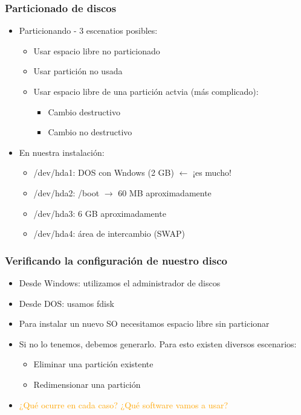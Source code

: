\begin{frame}
	\frametitle{Particionado de discos}
	\begin{itemize}
		\item Particionando - 3 escenatios posibles:
		\begin{itemize}
			\item Usar espacio libre no particionado
			\item Usar partición no usada
			\item Usar espacio libre de una partición actvia (más complicado):
			\begin{itemize}
				\item Cambio destructivo
				\item Cambio no destructivo
			\end{itemize}
		\end{itemize}
		\item En nuestra instalación:
		\begin{itemize}
			\item /dev/hda1: DOS con Wndows (2 GB) $\leftarrow$ ¡es mucho!
			\item /dev/hda2: /boot $\rightarrow$ 60 MB aproximadamente
			\item /dev/hda3: 6 GB aproximadamente
			\item /dev/hda4: área de intercambio (SWAP)
		\end{itemize}
	\end{itemize}
\end{frame}

\begin{frame}
	\frametitle{Verificando la configuración de nuestro disco}
	\begin{itemize}
		\item Desde Windows: utilizamos el administrador de discos
		\item Desde DOS: usamos fdisk
		\item Para instalar un nuevo SO necesitamos espacio libre sin particionar
		\item Si no lo tenemos, debemos generarlo. Para esto existen diversos escenarios:
		\begin{itemize}
			\item Eliminar una partición existente
			\item Redimensionar una partición
		\end{itemize}
		\item \textcolor{orange}{¿Qué ocurre en cada caso? ¿Qué software vamos a usar?}
	\end{itemize}
\end{frame}

